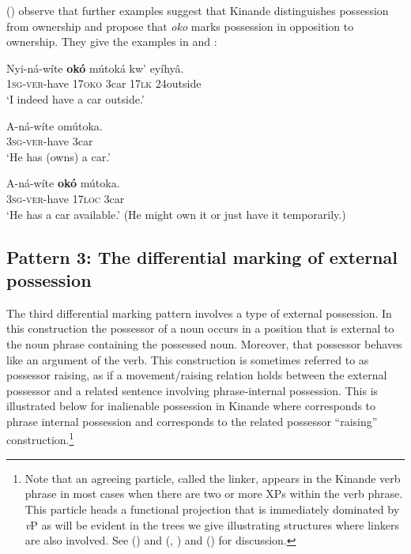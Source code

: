 \documentclass[output=paper]{langscibook}
\begin{document}
\citeauthor{SchneiderZiogaMutaka2019a} (\citeyear{SchneiderZiogaMutaka2019a}) observe that further examples suggest that Kinande distinguishes possession from ownership and propose that \textit{oko} marks possession in opposition to ownership. They give the examples in  and :

\ea \label{ex:schneider:okopossession}
\gll Nyi-ná-wíte \textbf{ok\'o}  mútoká    kw'   eyíhy\^a.\\
\textsc{1sg-ver}-have  \textsc{17oko} 3car  \textsc{17lk} 24outside\\
\glt  `I indeed have a car outside.'
\ex \label{ex:schneider:ownversusavailable}
\begin{xlist}

\ex \label{ex:schneider:own}
\gll A-ná-wíte  omútoka.\\
\textsc{3sg-ver}-have 3car\\
\glt  `He has (owns) a car.'

\ex \label{ex:schneider:available}
\gll A-ná-wíte \textbf{ok\'o} mútoka.\\
\textsc{3sg-ver}-have \textsc{17loc} 3car\\
\glt  `He has a car available.' \hfill (He might own it or just have it temporarily.)

\end{xlist}
\z

\subsection{Pattern 3: The differential marking of external possession}\label{sec:schneider:subsection2.3}

The third differential marking pattern involves a type of external possession. In this construction the possessor of a noun occurs in a position that is external to the noun phrase containing the possessed noun. Moreover, that possessor behaves like an argument of the verb. This construction is sometimes referred to as possessor raising, as if a movement/raising relation holds between the external possessor and a related sentence involving phrase-internal possession. This is illustrated below for inalienable possession in Kinande where  corresponds to phrase internal possession and  corresponds to the related possessor ``raising'' construction.\footnote{Note that an agreeing particle, called the linker, appears in the Kinande verb phrase in most cases when there are two or more XPs within the verb phrase. This particle heads a functional projection that is immediately dominated by \textit{v}P as will be evident in the trees we give illustrating structures where linkers are also involved. See \citeauthor{BakerCollins2006} (\citeyear{BakerCollins2006}) and \citeauthor{Schneider-Zioga2015a} (\citeyear{Schneider-Zioga2015a},  \citeyear{Schneider-Zioga2015b}) and \citeauthor{Schneider-ZiogaMutaka2015} (\citeyear{Schneider-ZiogaMutaka2015}) for discussion.}
\end{document}
